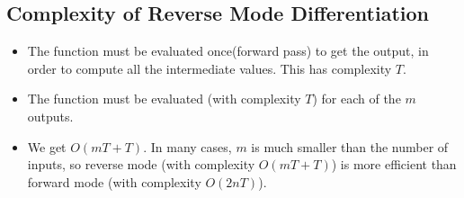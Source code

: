 \subsection{Complexity of Reverse Mode Differentiation}
\begin{itemize}
    \item The function must be evaluated once(forward pass) to get the output, in order to compute all the intermediate values. This has complexity $T$.
    \item The function must be evaluated (with complexity $T$) for each of the $m$ outputs.
    \item We get $O(mT + T)$. In many cases, $m$ is much smaller than the number of inputs, so reverse mode (with complexity $O(mT+T)$) is more efficient than forward mode (with complexity $O(2nT)$).
\end{itemize}
